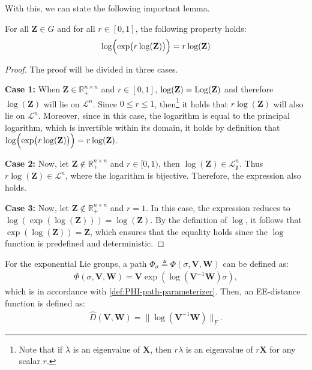 With this, we can state the following important lemma.
\begin{lemma}\label{lemma:log-exp-log-equals-log}
    For all $\mathbf{Z}\in G$ and for all $r \in[0, 1]$, the following property holds:
    \begin{align*}
        \log\Bigl(\exp\bigl(r\log(\mathbf{Z})\bigr)\Bigr) = r\log(\mathbf{Z})
    \end{align*}
\end{lemma}
\begin{proof}
    The proof will be divided in three cases.
    
    \textbf{Case 1:} When $\mathbf{Z} \in \mathbb{R}_+^{n\times n}$ and $r\in[0,1]$, $\log(\mathbf{Z})=\operatorname{Log}(\mathbf{Z})$ and therefore $\log(\mathbf{Z})$ will lie on $\mathcal{L}^n$. Since $0\le r\le1$, then\footnote{Note that if $\lambda$ is an eigenvalue of $\mathbf{X}$, then $r\lambda$ is an eigenvalue of $r\mathbf{X}$ for any scalar $r$.} it holds that $r \log(\mathbf{Z})$ will also lie on $\mathcal{L}^n$. Moreover, since in this case, the logarithm is equal to the principal logarithm, which is invertible within its domain, it holds by definition that $\log\Bigl(\exp\bigl(r\log(\mathbf{Z})\bigr)\Bigr) = r\log(\mathbf{Z})$.

    \textbf{Case 2:} Now, let $\mathbf{Z}\notin \mathbb{R}_+^{n\times n}$ and $r\in[0, 1)$, then $\log(\mathbf{Z}) \in \mathcal{L}^n_\mathfrak{g}$. Thus $r\log(\mathbf{Z})\in\mathcal{L}^n$, where the logarithm is bijective. Therefore, the expression also holds.

    \textbf{Case 3:} Now, let $\mathbf{Z}\notin \mathbb{R}_+^{n\times n}$ and $r=1$. In this case, the expression reduces to $\log(\exp(\log(\mathbf{Z}))) = \log(\mathbf{Z})$. By the definition of $\log$, it follows that $\exp(\log(\mathbf{Z})) = \mathbf{Z}$, which ensures that the equality holds since the $\log$ function is predefined and deterministic.
\end{proof}
For the exponential Lie groups, a path $\Phi_\sigma\triangleq\Phi(\sigma, \mathbf{V}, \mathbf{W})$ can be defined as:
\begin{align}
    \Phi(\sigma, \mathbf{V}, \mathbf{W}) = \mathbf{V}\exp{\left(\log{\left(\mathbf{V}^{-1}\mathbf{W}\right)}\sigma\right)}, \label{eq:PHI-path-parameterizer-utilized-exp-of-log}
\end{align}
which is in accordance with \cref{def:PHI-path-parameterizer}. Then, an EE-distance function is defined as:
\begin{align}
    \widehat{D}(\mathbf{V}, \mathbf{W}) = \|\log{(\mathbf{V}^{-1}\mathbf{W})}\|_F.\label{eq:distance-D-hat-utilized-log-norm}
\end{align}

